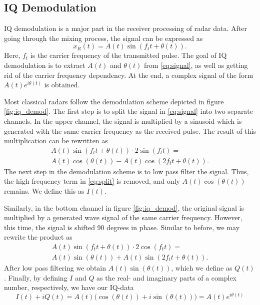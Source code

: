 
\begin{appendices}

\chapter{IQ Demodulation}
IQ demodulation is a major part in the receiver processing of radar data. After going through the mixing process, the signal can be expressed as \citep{lee_1991}
\begin{equation}
\label{eq:signal}
	x_R(t)=A(t)\sin(f_t t+\theta(t)).
\end{equation}
Here, $f_t$ is the carrier frequency of the transmitted pulse. The goal of IQ demodulation is to extract $A(t)$ and $\theta(t)$ from \eqref{eq:signal}, as well as getting rid of the carrier frequency dependency. At the end, a complex signal of the form $A(t)e^{i\theta(t)}$ is obtained.

Most classical radars follow the demodulation scheme depicted in figure \ref{fig:iq_demod}. The first step is to split the signal in \eqref{eq:signal} into two separate channels. In the upper channel, the signal is multiplied by a sinusoid which is generated with the same carrier frequency as the received pulse. The result of this multiplication can be rewritten as
\begin{gather}
	 A(t)\sin(f_t t+\theta(t))\cdot 2\sin(f_t t) = \\
	\label{eq:split}
 	 A(t)\cos(\theta(t))-A(t)\cos(2f_t t+\theta(t)).
\end{gather}
The next step in the demodulation scheme is to low pass filter the signal. Thus, the high frequency term in \eqref{eq:split} is removed, and only $A(t)\cos(\theta(t))$ remains. We define this as $I(t)$.

Similarly, in the bottom channel in figure \ref{fig:iq_demod}, the original signal is multiplied by a generated wave signal of the same carrier frequency. However, this time, the signal is shifted 90 degrees in phase. Similar to before, we may rewrite the product as
\begin{gather}
	 A(t)\sin(f_t t+\theta(t))\cdot 2\cos(f_t t) = \\
	\label{eq:split2}
 	 A(t)\sin(\theta(t))+A(t)\sin(2f_t t+\theta(t)).
\end{gather}
After low pass filtering we obtain $A(t)\sin(\theta(t))$, which we define as $Q(t)$. Finally, by defining $I$ and $Q$ as the real- and imaginary parts of a complex number, respectively, we have our IQ-data
\begin{equation}
	I(t)+iQ(t)=A(t)\Big(\cos(\theta(t))+i\sin(\theta(t))\Big)=A(t)e^{i\theta(t)}
\end{equation}


\end{appendices}
